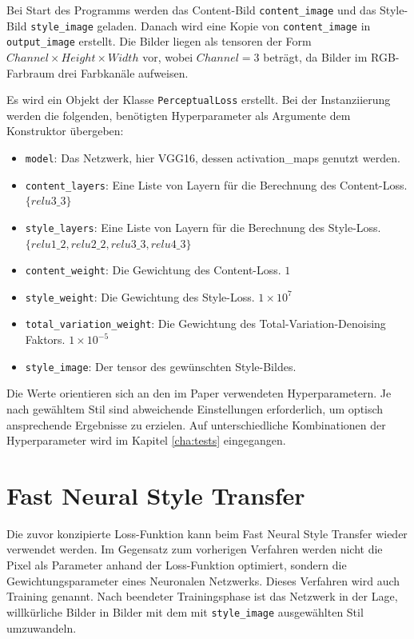 Bei Start des Programms werden das Content-Bild \texttt{content_image} und das Style-Bild \texttt{style_image} geladen. Danach wird eine Kopie von \texttt{content_image} in \texttt{output_image} erstellt. Die Bilder liegen als \gls{tensor}en der Form $ Channel \times Height \times Width $ vor, wobei $ Channel = 3 $ beträgt, da Bilder im RGB-Farbraum drei Farbkanäle aufweisen.

Es wird ein Objekt der Klasse \texttt{PerceptualLoss} erstellt. Bei der Instanziierung werden die folgenden, benötigten Hyperparameter als Argumente dem Konstruktor übergeben:

\begin{itemize}
	\item \texttt{model}: Das Netzwerk, hier VGG16, dessen \gls{activation_map}s genutzt werden.
	\item \texttt{content_layers}: Eine Liste von Layern für die Berechnung des Content-Loss.\\ $ \{ relu3\_3 \} $
	\item \texttt{style_layers}: Eine Liste von Layern für die Berechnung des Style-Loss.\\ $ \{ relu1\_2, relu2\_2, relu3\_3, relu4\_3 \} $
	\item \texttt{content_weight}: Die Gewichtung des Content-Loss. $ 1 $ 
	\item \texttt{style_weight}: Die Gewichtung des Style-Loss. $ 1 \times 10^{7} $
	\item \texttt{total_variation_weight}: Die Gewichtung des Total-Variation-Denoising Faktors. $ 1 \times 10^{-5} $
	\item \texttt{style_image}: Der \gls{tensor} des gewünschten Style-Bildes.
\end{itemize}

Die Werte orientieren sich an den im Paper \cite{DBLP:journals/corr/JohnsonAL16} verwendeten Hyperparametern. Je nach gewähltem Stil sind abweichende Einstellungen erforderlich, um optisch ansprechende Ergebnisse zu erzielen. Auf unterschiedliche Kombinationen der Hyperparameter wird im Kapitel \ref{cha:tests} eingegangen.

\section{Fast Neural Style Transfer}

Die zuvor konzipierte Loss-Funktion kann beim Fast Neural Style Transfer wieder verwendet werden. 
Im Gegensatz zum vorherigen Verfahren werden nicht die Pixel als Parameter anhand der Loss-Funktion optimiert, sondern die Gewichtungsparameter eines Neuronalen Netzwerks. Dieses Verfahren wird auch Training genannt. Nach beendeter Trainingsphase ist das Netzwerk in der Lage, willkürliche Bilder in Bilder mit dem mit \texttt{style_image} ausgewählten Stil umzuwandeln.

